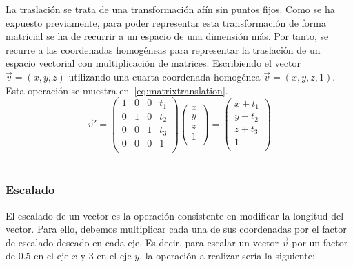 La traslación se trata de una transformación afín sin puntos fijos. Como se ha
expuesto previamente, para poder representar esta transformación de forma
matricial se ha de recurrir a un espacio de una dimensión más. Por tanto, se
recurre a las coordenadas homogéneas para representar la traslación de un
espacio vectorial con multiplicación de matrices. Escribiendo el vector
$\overrightarrow{v} = (x,y,z)$ utilizando una cuarta coordenada homogénea
$\overrightarrow{v} = (x,y,z,1)$. Esta operación se muestra
en~\eqref{eq:matrixtranslation}. \\

\begin{equation}
	\label{eq:matrixtranslation}
	\overrightarrow{v}' = 
	\left( \begin{array}{cccc}
			1 & 0 & 0 & t_1 \\
			0 & 1 & 0 & t_2 \\
			0 & 0 & 1 & t_3 \\
			0 & 0 & 0 & 1 \\
	\end{array} \right)
	\left( \begin{array}{c}
			x \\
			y \\
			z \\
			1 \\
	\end{array} \right) = 
	\left( \begin{array}{c}
			x + t_1 \\
			y + t_2 \\
			z + t_3 \\
			1 \\
	\end{array} \right)
\end{equation}\\

\subsubsection{Escalado}
\label{makereference5.4.1.2}

El escalado de un vector es la operación consistente en modificar la longitud
del vector. Para ello, debemos multiplicar cada una de sus coordenadas por el
factor de escalado deseado en cada eje. Es decir, para escalar un vector
$\overrightarrow{v}$ por un factor de $0.5$ en el eje $x$ y $3$ en el eje $y$,
la operación a realizar sería la siguiente:\\

